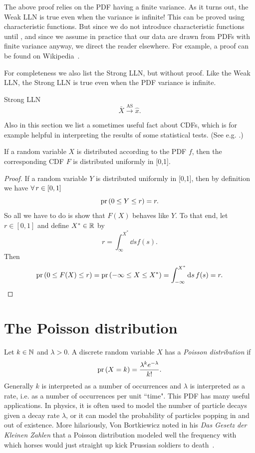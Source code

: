 The above proof relies on the PDF having a finite
variance. As it turns out, the Weak LLN is true
even when the variance is infinite! This can be proved
using characteristic functions. But since we do not introduce characteristic
functions until , and since we assume in practice
that our data are drawn from PDFs with finite variance anyway,
we direct the reader elsewhere. For example, a proof can be
found on Wikipedia~\cite{Wiki_LLN}.

For completeness we also list the Strong LLN, but without proof. 
Like the Weak LLN, the Strong LLN is true even when the PDF variance
is infinite.

\begin{theorem}{Strong LLN}{}
  $$
    \bar{X}\xrightarrow{\text{AS}}\hat{x}.
  $$
\end{theorem}

Also in this section we list a sometimes useful fact about CDFs, which is
for example helpful in interpreting the results of some statistical
tests. (See e.g. .) 

\begin{proposition}{}{}
  If a random variable $X$ is distributed according to the PDF $f$, then
  the corresponding CDF $F$ is distributed uniformly in [0,1].
  \begin{proof}
    If a random variable $Y$ is distributed uniformly in [0,1], then
    by definition we have $\operatorname{\forall} r\in [0,1]$
    $$
      \pr{0\leq Y\leq r}=r.
    $$
    So all we have to do is show that $F(X)$ behaves like $Y$. To that end,
    let $r\in[0,1]$ and define $X^*\in\mathbb{R}$ by
    $$
      r=\int_\infty^{X^*}\dd{s}f(s).
    $$
    Then
    $$
      \pr{0\leq F(X)\leq r}
      =\pr{-\infty\leq X\leq X^*}
      =\int_{-\infty}^{X^*}\dd{s}f(s)
      =r.
    $$
  \end{proof}
\end{proposition}


\section{The Poisson distribution}\label{sec:Poisson}

Let $k\in\mathbb{N}$ and $\lambda>0$. A discrete random variable $X$ has 
a {\it Poisson distribution} if
\begin{equation}\label{eq:poisson}
\pr{X=k}=\frac{\lambda^k e^{-\lambda}}{k!}.
\end{equation}
Generally $k$ is interpreted as a number of occurrences and $\lambda$ is
interpreted as a rate, i.e. as a number of occurrences per unit ``time".
This PDF has many useful applications. In physics, it is often used to model 
the number of particle decays given a decay rate $\lambda$, or it can
model the probability of particles popping in and out of existence. More hilariously, 
Von Bortkiewicz noted in his {\it Das Gesetz der Kleinen Zahlen} that a Poisson
distribution modeled well the frequency with which horses would just straight 
up kick Prussian soldiers to death~\cite{funnyPrussianMan}.


